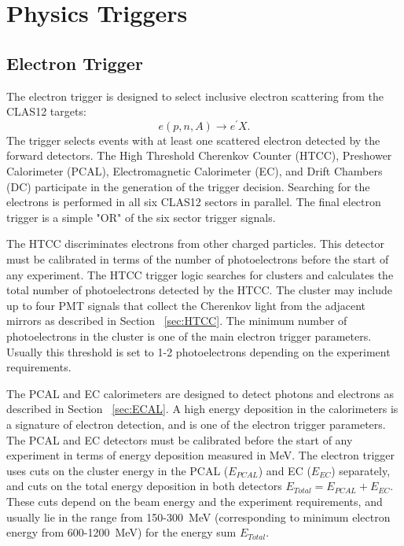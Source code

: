 
\section{Physics Triggers}
\label{sec:physics_triggers}


\subsection{Electron Trigger}
\label{sec:electron_trigger}

The electron trigger is designed to select inclusive electron scattering from the CLAS12 targets:
\begin{equation}
e(p,n,A)\rightarrow e^\prime X.
\label{eqn:electron}
\end{equation}
\noindent
The trigger  selects  events with at least one scattered electron detected by the forward detectors. The High Threshold Cherenkov Counter (HTCC),  Preshower Calorimeter (PCAL),  Electromagnetic Calorimeter (EC), and Drift Chambers (DC) participate in the generation of the trigger decision. Searching for the electrons is performed  in all six CLAS12 sectors in parallel. The final electron trigger is  a simple "OR" of the six sector trigger signals.

The HTCC discriminates electrons from other charged particles. This detector must be calibrated in terms of the number of photoelectrons before the start of any experiment. The HTCC trigger logic  searches for clusters and calculates the total number of  photoelectrons  detected by the HTCC. The cluster may include up to four PMT signals that collect the Cherenkov light from the adjacent mirrors as described in Section ~\ref{sec:HTCC}. The minimum number of  photoelectrons in the cluster  is one of the main electron trigger parameters. Usually this threshold is set to 1-2 photoelectrons depending on the experiment requirements.

The PCAL and EC calorimeters are designed to detect photons and electrons as described in Section ~\ref{sec:ECAL}. A high energy deposition in the calorimeters is a signature of electron detection, and is one of the electron trigger parameters. The PCAL and EC detectors must be calibrated before the start of any experiment in terms of energy deposition measured in MeV. The electron trigger uses cuts on the cluster energy in the PCAL ($E_{PCAL}$) and EC ($E_{EC}$) separately, and cuts on the total energy deposition in both detectors $E_{Total}=E_{PCAL}+E_{EC}$.
These cuts   depend  on the beam energy and the experiment requirements, and usually lie in the range from  150-300~MeV (corresponding to minimum electron energy from 600-1200~MeV) for the energy sum $E_{Total}$.

